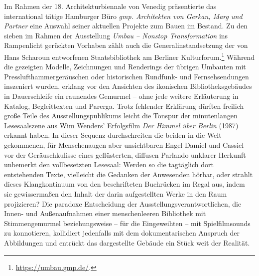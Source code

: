 \documentclass[a4paper,
fontsize=11pt,
oneside,
numbers=noperiodatend,
parskip=half-,
bibliography=totoc,
final
]{scrartcl}
\begin{document}
Im Rahmen der 18. Architekturbiennale von Venedig präsentierte das
international tätige Hamburger Büro \emph{gmp. Architekten von Gerkan,
Marg und Partner} eine Auswahl seiner aktuellen Projekte zum Bauen im
Bestand. Zu den sieben im Rahmen der Ausstellung \emph{Umbau -- Nonstop
Transformation} ins Rampenlicht gerückten Vorhaben zählt auch die
Generalinstandsetzung der von Hans Scharoun entworfenen Staatsbibliothek
am Berliner Kulturforum.\footnote{\url{https://umbau.gmp.de/}.} Während
die gezeigten Modelle, Zeichnungen und Renderings der übrigen Umbauten
mit Presslufthammergeräuschen oder historischen Rundfunk- und
Fernsehsendungen inszeniert wurden, erklang vor den Ansichten des
ikonischen Bibliotheksgebäudes in Dauerschleife ein raunendes Gemurmel
-- ohne jede weitere Erläuterung in Katalog, Begleittexten und Parerga.
Trotz fehlender Erklärung dürften freilich große Teile des
Ausstellungspublikums leicht die Tonspur der minutenlangen Lesesaalszene
aus Wim Wenders' Erfolgsfilm \emph{Der Himmel über Berlin} (1987)
erkannt haben. In dieser Sequenz durchschreiten die beiden in die Welt
gekommenen, für Menschenaugen aber unsichtbaren Engel Damiel und Cassiel
vor der Geräuschkulisse eines geflüsterten, diffusen Parlando unklarer
Herkunft unbemerkt den vollbesetzten Lesesaal: Werden so die tagtäglich
dort entstehenden Texte, vielleicht die Gedanken der Anwesenden hörbar,
oder strahlt dieses Klangkontinuum von den beschrifteten Buchrücken im
Regal aus, indem sie gewissermaßen den Inhalt der darin aufgestellten
Werke in den Raum projizieren? Die paradoxe Entscheidung der
Ausstellungsverantwortlichen, die Innen- und Außenaufnahmen einer
menschenleeren Bibliothek mit Stimmengemurmel beziehungsweise -- für
die Eingeweihten -- mit Spielfilmsounds zu konnotieren, kollidiert
jedenfalls mit dem dokumentarischen Anspruch der Abbildungen und
entrückt das dargestellte Gebäude ein Stück weit der Realität.
\end{document}
